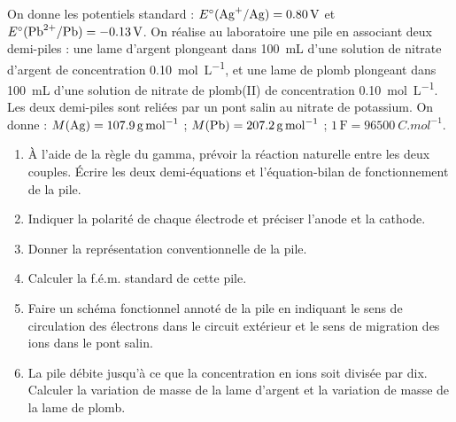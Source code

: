 \documentclass[11pt]{article}
\begin{document}
\begin{exercice}
On donne les potentiels standard : $E^\circ(\ce{Ag+}/\ce{Ag}) = \SI{+0,80}{V}$ et $E^\circ(\ce{Pb^2+}/\ce{Pb}) = \SI{-0,13}{V}$. On réalise au laboratoire une pile en associant deux demi-piles : une lame d'argent plongeant dans \SI{100}{mL} d'une solution de nitrate d'argent de concentration \SI{0,10}{mol.L^{-1}}, et une lame de plomb plongeant dans \SI{100}{mL} d'une solution de nitrate de plomb(II) de concentration \SI{0,10}{mol.L^{-1}}. Les deux demi-piles sont reliées par un pont salin au nitrate de potassium. On donne : $M(\ce{Ag}) = \SI{107,9}{g.mol^{-1}}$ ; $M(\ce{Pb}) = \SI{207,2}{g.mol^{-1}}$ ; $1\,\mathrm{F} = \SI{96500}{C.mol^{-1}}$.
\begin{enumerate}
\item À l'aide de la règle du gamma, prévoir la réaction naturelle entre les deux couples. Écrire les deux demi-équations et l'équation-bilan de fonctionnement de la pile.
\item Indiquer la polarité de chaque électrode et préciser l'anode et la cathode.
\item Donner la représentation conventionnelle de la pile.
\item Calculer la f.é.m. standard de cette pile.
\item Faire un schéma fonctionnel annoté de la pile en indiquant le sens de circulation des électrons dans le circuit extérieur et le sens de migration des ions dans le pont salin.
\item La pile débite jusqu'à ce que la concentration en ions  soit divisée par dix. Calculer la variation de masse de la lame d'argent et la variation de masse de la lame de plomb.
\end{enumerate}
\end{exercice}
\end{document}
